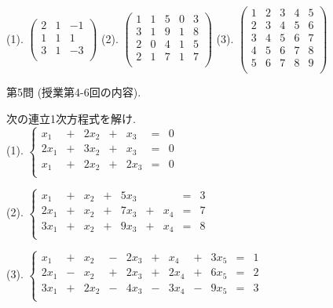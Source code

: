 \documentclass[dvipdfmx,a4paper,11pt]{article}
\theoremstyle{definition}
\begin{document}
 \vspace{11pt}
(1).
$
 \begin{pmatrix}
2&1&-1 \\
1&1& 1 \\
3&1&-3 \\
 \end{pmatrix}
 $
(2).
$
 \begin{pmatrix}
 1& 1& 5  & 0&3\\
 3& 1& 9  & 1&8\\
 2& 0& 4 & 1&5\\
 2& 1& 7 & 1&7\\
 \end{pmatrix}
 $
 (3).
 $
 \begin{pmatrix}
 1& 2& 3  & 4&5\\
 2& 3& 4  & 5&6\\
 3& 4& 5 & 6&7\\
 4& 5& 6 & 7&8\\
 5& 6& 7 & 8&9\\
 \end{pmatrix}
 $
 
\vspace{33pt} 
   
{\Large 第5問} (授業第4-6回の内容).
    \vspace{11pt}

次の連立1次方程式を解け. \\

(1).
 $
 \left\{ 
\begin{matrix}
x_1& + &  2x_2&  +& x_3&  = & 0 \\
2x_1& + & 3x_2&  +& x_3&  = & 0 \\
 x_1& + & 2x_2&  +& 2x_3&  = & 0 \\
\end{matrix}
\right.
 $

(2).
 $
 \left\{ 
\begin{matrix}
x_1& + &  x_2&  +& 5x_3&  && = & 3 \\
2x_1& + &  x_2&  +& 7x_3& + &x_4& = & 7 \\
3x_1& + &  x_2&  +& 9x_3& + &x_4& = & 8 \\
\end{matrix}
\right.
 $
 
(3).
 $
 \left\{ 
\begin{array}{ccccccccccc}
x_1& +& x_2&  -&2x_3	&+&x_4& +&3x_5&=& 1\\
2x_1&-&x_2& + &2x_3&+&2x_4&+&6x_5&= &2 \\
3x_1&+&2x_2& - &4x_3& - &  3x_4  &-&9x_5&= &3\\
\end{array}
\right.
 $
 
\end{document}
